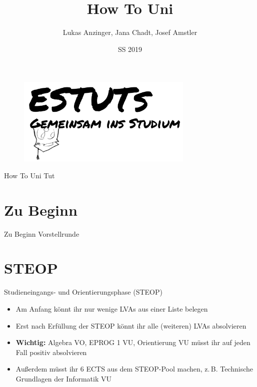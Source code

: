 \documentclass{beamer}
\title{How To Uni}
\date{SS 2019}
\author{Lukas Anzinger, Jana Chadt, Josef Amstler}
\begin{document}
\begin{frame}
    \begin{figure}[htp]
        \centering
        \includegraphics[width=0.75\textwidth]{eule_text.png}
    \end{figure}
    \maketitle
\end{frame}

\begin{frame}{How To Uni Tut}
    \setcounter{tocdepth}{1}
    \tableofcontents
\end{frame}

\section*{Zu Beginn}
\begin{frame}{Zu Beginn}
    Vorstellrunde
\end{frame}

\section{STEOP}
\begin{frame}{Studieneingangs- und Orientierungsphase (STEOP)}
    \begin{itemize}
        \item Am Anfang könnt ihr nur wenige LVAs aus einer Liste belegen
        \item Erst nach Erfüllung der STEOP könnt ihr alle (weiteren) LVAs
              absolvieren
        \item \textbf{Wichtig:} Algebra VO, EPROG 1 VU, Orientierung VU
              müsst ihr auf jeden Fall positiv absolvieren
        \item Außerdem müsst ihr 6 ECTS aus dem STEOP-Pool machen,
              z.\,B. Technische Grundlagen der Informatik VU
    \end{itemize}
\end{frame}
\end{document}
